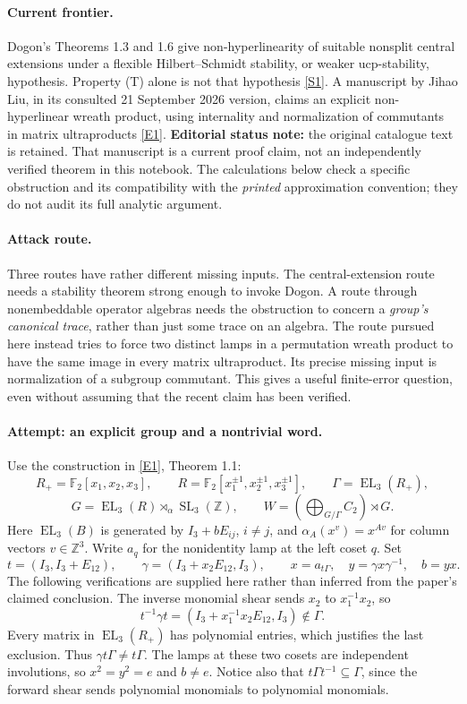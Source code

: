 \documentclass[11pt,a4paper]{article}
\newcommand{\Z}{\mathbb{Z}}
\newcommand{\F}{\mathbb{F}}
\newcommand{\sref}[2]{\hyperlink{source:#1:#2}{[S#2]}}
\newcommand{\eref}[2]{\hyperlink{extra:#1:#2}{[E#2]}}
\numberwithin{equation}{section}
\begin{document}
\paragraph{Current frontier.}
Dogon's Theorems 1.3 and 1.6 give non-hyperlinearity of suitable nonsplit
central extensions under a flexible Hilbert--Schmidt stability, or weaker
ucp-stability, hypothesis. Property (T) alone is not that hypothesis
\sref{30006756}{1}. A manuscript by Jihao Liu, in its consulted 21 September 2026 version, claims an
explicit non-hyperlinear wreath product, using internality and normalization
of commutants in matrix ultraproducts \eref{30006756}{1}. \textbf{Editorial status
note:} the original catalogue text is retained. That manuscript is a current
proof claim, not an independently verified theorem in this notebook. The
calculations below check a specific obstruction and its compatibility with
the \emph{printed} approximation convention; they do not audit its full
analytic argument.

\paragraph{Attack route.}
Three routes have rather different missing inputs. The central-extension
route needs a stability theorem strong enough to invoke Dogon. A route
through nonembeddable operator algebras needs the obstruction to concern a
\emph{group's canonical trace}, rather than just some trace on an algebra.
The route pursued here instead tries to force two distinct lamps in a
permutation wreath product to have the same image in every matrix
ultraproduct. Its precise missing input is normalization of a subgroup
commutant. This gives a useful finite-error question, even without assuming
that the recent claim has been verified.

\paragraph{Attempt: an explicit group and a nontrivial word.}
Use the construction in \eref{30006756}{1}, Theorem 1.1:
\[
 R_+=\F_2[x_1,x_2,x_3],\qquad
 R=\F_2[x_1^{\pm1},x_2^{\pm1},x_3^{\pm1}],\qquad
 \Gamma=\operatorname{EL}_3(R_+),
\]
\[
 G=\operatorname{EL}_3(R)\rtimes_\alpha\operatorname{SL}_3(\Z),\qquad
 W=\left(\bigoplus_{G/\Gamma}C_2\right)\rtimes G.
\]
Here $\operatorname{EL}_3(B)$ is generated by $I_3+bE_{ij}$, $i\ne j$,
and $\alpha_A(x^v)=x^{Av}$ for column vectors $v\in\Z^3$.
Write $a_q$ for the nonidentity lamp at the left coset $q$. Set
\[
 t=(I_3,I_3+E_{12}),\qquad
 \gamma=(I_3+x_2E_{12},I_3),\qquad
 x=a_{t\Gamma},\quad y=\gamma x\gamma^{-1},\quad b=yx.
\]
The following verifications are supplied here rather than inferred from the
paper's claimed conclusion. The inverse monomial shear sends $x_2$ to
$x_1^{-1}x_2$, so
\[
 t^{-1}\gamma t=(I_3+x_1^{-1}x_2E_{12},I_3)\notin\Gamma.
\]
Every matrix in $\operatorname{EL}_3(R_+)$ has polynomial entries, which
justifies the last exclusion. Thus $\gamma t\Gamma\ne t\Gamma$. The lamps
at these two cosets are independent involutions, so $x^2=y^2=e$ and
$b\ne e$. Notice also that $t\Gamma t^{-1}\subseteq\Gamma$, since the
forward shear sends polynomial monomials to polynomial monomials.
\end{document}
